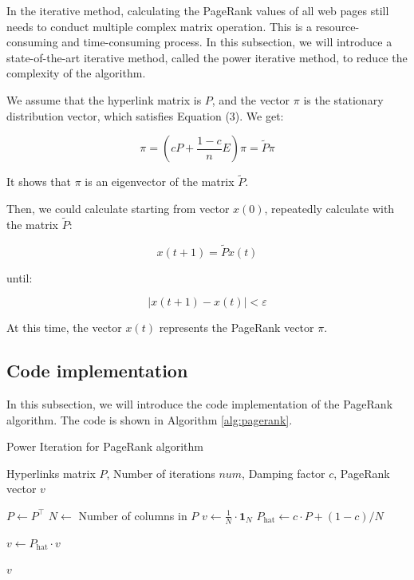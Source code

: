 \documentclass[lettersize,journal,12pt,conference]{IEEEtran}
\begin{document}
In the iterative method, calculating the PageRank values of all web pages still needs to conduct multiple complex matrix operation. This is a resource-consuming and time-consuming process. In this subsection, we will introduce a state-of-the-art iterative method, called the power iterative method, to reduce the complexity of the algorithm.

We assume that the hyperlink matrix is $P$, and the vector $\pi$ is the stationary distribution vector, which satisfies Equation (3). We get:

\begin{equation}
	\label{eq:9}
	\pi = (cP + \frac{1 - c}{n}E)\pi = \widetilde{P}\pi
\end{equation}

It shows that $\pi$ is an eigenvector of the matrix $\widetilde{P}$.

Then, we could calculate starting from vector $x(0)$, repeatedly calculate with the matrix $\widetilde{P}$:

\begin{equation}
	\label{eq:10}
	x(t+1) = \widetilde{P}x(t)
\end{equation}

until:

\begin{equation}
	\label{eq:11}
	|x(t+1) - x(t)| < \varepsilon
\end{equation}

At this time, the vector $x(t)$ represents the PageRank vector $\pi$.

\subsection{Code implementation}

In this subsection, we will introduce the code implementation of the PageRank algorithm. The code is shown in Algorithm \ref{alg:pagerank}.

\begin{algorithm}
	\caption{Power Iteration for PageRank algorithm}
	\label{alg:pagerank}
	\begin{algorithmic}[1]

		\REQUIRE Hyperlinks matrix $P$, Number of iterations $num$, Damping factor $c$, PageRank vector $v$

		\STATE $P \gets P^\top$ 
		\STATE $N \gets$ Number of columns in $P$
		\STATE $v \gets \frac{1}{N} \cdot \mathbf{1}_N$ 
		\STATE $P_{\text{hat}} \gets c \cdot P + (1 - c) / N$ 

		\STATE $v \gets P_{\text{hat}} \cdot v$ 
		\ENDFOR

		\RETURN $v$

	\end{algorithmic}
\end{algorithm}
\end{document}
